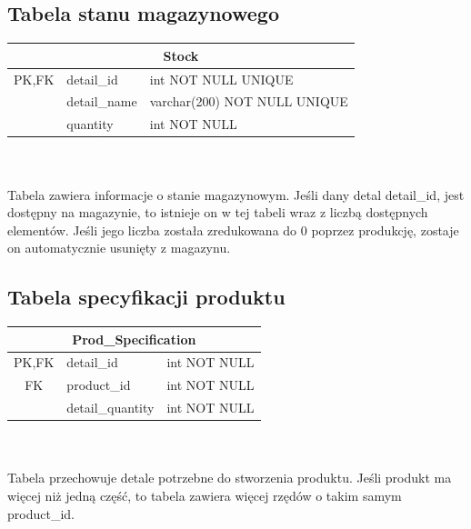 \documentclass{article}
\begin{document}
\subsection{Tabela stanu magazynowego}
\begin{tabular}{|c|l|l|} \hline
   \multicolumn{3}{|c|}{Stock}                         \\ \hline
   PK,FK & detail\_id   & int NOT NULL UNIQUE          \\ \hline
         & detail\_name & varchar(200) NOT NULL UNIQUE \\
         & quantity     & int NOT NULL                 \\ \hline
\end{tabular} \\
\vspace{0.3cm} \\
Tabela zawiera informacje o stanie magazynowym. Jeśli dany detal detail\_id,
jest dostępny na magazynie, to istnieje on w tej tabeli wraz z liczbą dostępnych
elementów. Jeśli jego liczba została zredukowana do 0 poprzez produkcję, zostaje
on automatycznie usunięty z magazynu.
\newpage
\subsection{Tabela specyfikacji produktu}
\begin{tabular}{|c|l|l|} \hline
   \multicolumn{3}{|c|}{Prod\_Specification} \\ \hline
   PK,FK & detail\_id       & int NOT NULL   \\ \hline
   FK    & product\_id      & int NOT NULL   \\
         & detail\_quantity & int NOT NULL   \\ \hline
\end{tabular} \\
\vspace{0.3cm} \\
Tabela przechowuje detale potrzebne do stworzenia produktu. Jeśli produkt ma
więcej niż jedną część, to tabela zawiera więcej rzędów o takim samym product\_id.
\end{document}

